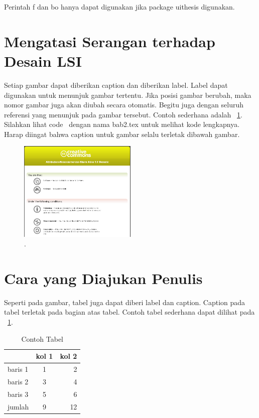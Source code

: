 Perintah \bslash f dan \bslash bo hanya dapat digunakan jika package 
uithesis digunakan. 

\section{Mengatasi Serangan terhadap Desain LSI}

Setiap gambar dapat diberikan caption dan diberikan label. Label dapat digunakan untuk menunjuk gambar tertentu.  Jika posisi gambar berubah, maka nomor gambar juga akan diubah secara otomatis. Begitu juga dengan seluruh referensi yang menunjuk pada gambar tersebut. Contoh sederhana adalah \pic~\ref{fig:testGambar}. Silahkan lihat code \latex~dengan nama bab2.tex untuk melihat kode lengkapnya. Harap diingat bahwa caption untuk gambar selalu terletak dibawah gambar.

\begin{figure}
	\centering
	\includegraphics[width=0.50\textwidth]
		{pics/creative_common.png}
	\caption{\license.}
	\label{fig:testGambar}
\end{figure}

\section{Cara yang Diajukan Penulis}

Seperti pada gambar, tabel juga dapat diberi label dan caption.  Caption pada tabel terletak pada bagian atas tabel. Contoh tabel sederhana dapat dilihat pada \tab~\ref{tab:tab1}.

\begin{table}
	\centering
	\caption{Contoh Tabel}
	\label{tab:tab1}
	\begin{tabular}{| l | c r |}
		\hline
		& kol 1 & kol 2 \\ 
		\hline
		baris 1 & 1 & 2 \\
		baris 2 & 3 & 4 \\
		baris 3 & 5 & 6 \\
		jumlah  & 9 & 12 \\
		\hline
	\end{tabular}
\end{table}

